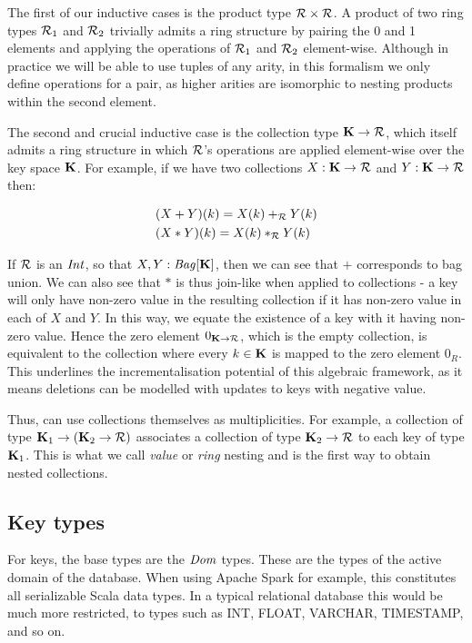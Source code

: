 {{The first of our inductive cases is the product type $\mathcal{R} \times \mathcal{R}$. A product of two ring types $\mathcal{R}_1$ and $\mathcal{R}_2$ trivially admits a ring structure by pairing the 0 and 1 elements and applying the operations of $\mathcal{R}_1$ and $\mathcal{R}_2$ element-wise. Although in practice we will be able to use tuples of any arity, in this formalism we only define operations for a pair, as higher arities are isomorphic to nesting products within the second element.

The second and crucial inductive case is the collection type $\mathbf{K} \rightarrow \mathcal{R}$, which itself admits a ring structure in which $\mathcal{R}$'s operations are applied element-wise over the key space $\mathbf{K}$. For example, if we have two collections $X: \mathbf{K} \rightarrow \mathcal{R}$ and $Y: \mathbf{K} \rightarrow \mathcal{R}$ then:

\begin{equation*}
\begin{split}
& (X+Y)(k)  = X(k) +_{\mathcal{R}} Y(k) \\
& (X*Y)(k) = X(k) *_{\mathcal{R}} Y(k)
\end{split}
\end{equation*}

If $\mathcal{R}$ is an $\textrm{\textit{Int}}$, so that $X,Y: \textrm{\textit{Bag}}[\mathbf{K}]$, then we can see that $+$ corresponds to bag union. We can also see that $*$ is thus join-like when applied to collections - a key will only have non-zero value in the resulting collection if it has non-zero value in each of $X$ and $Y$. In this way, we equate the existence of a key with it having non-zero value. Hence the zero element $0_{\mathbf{K} \rightarrow \mathcal{R}}$, which is the empty collection, is equivalent to the collection where every $k \in \mathbf{K}$ is mapped to the zero element $0_R$. This underlines the incrementalisation potential of this algebraic framework, as it means deletions can be modelled with updates to keys with negative value.

Thus, can use collections themselves as multiplicities. For example, a collection of type $\mathbf{K}_1 \rightarrow (\mathbf{K}_2 \rightarrow \mathcal{R})$ associates a collection of type $\mathbf{K}_2 \rightarrow \mathcal{R}$ to each key of type ${\mathbf{K}_1}$. This is what we call \textit{value} or \textit{ring} nesting and is the first way to obtain nested collections.

\subsection{Key types} {

For keys, the base types are the $\textrm{\textit{Dom}}$ types. These are the types of the active domain of the database. When using Apache Spark for example, this constitutes all serializable Scala data types. In a typical relational database this would be much more restricted, to types such as INT, FLOAT, VARCHAR, TIMESTAMP, and so on. 

}}}
